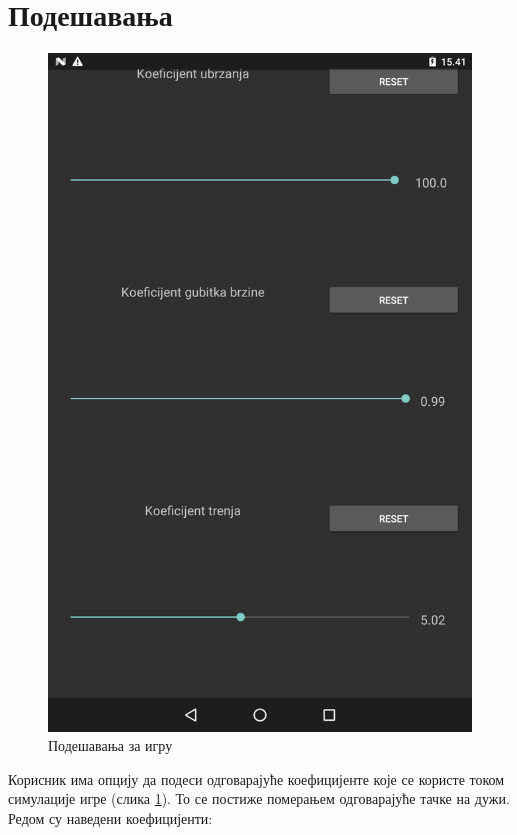 \section{Подешавања}
\begin{figure}[htb!]
\begin{center}
\includegraphics[scale=.1]{pictures/settings/basic}
\caption{Подешавања за игру}\label{fig:settingsBasic}
\end{center}
\end{figure}
Корисник има опцију да подеси одговарајуће коефицијенте  које се користе током симулације игре (слика \ref{fig:settingsBasic}). То се постиже померањем одговарајуће тачке на дужи. Редом су наведени коефицијенти:
